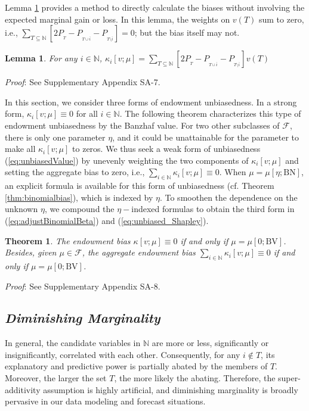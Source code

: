 \documentclass[a4paper,12pt]{article}
\newtheorem{theorem}{Theorem}
\newtheorem{lemma}{Lemma}
\begin{document}
Lemma \ref{lm:bias} provides a method to directly calculate the biases without involving the expected marginal gain or loss.
In this lemma, the weights on $v(T)$ sum to zero, i.e., $\sum\limits_{T\subseteq \mathbb{N}} \left [2 P_{_T} - P_{_{T \cup \overline{i}}} - P_{_{T \setminus \overline{i}}} \right ] = 0$; 
but the bias itself may not.
\begin{lemma}\label{lm:bias}
For any $i\in \mathbb{N}$,
$
\kappa_i [v;\mu] = \sum\limits_{T\subseteq \mathbb{N}} \left [2 P_{_T} - P_{_{T \cup \overline{i}}} - P_{_{T \setminus \overline{i}}} \right ] v(T)
$
\end{lemma}

\noindent \textit{Proof}: See Supplementary Appendix SA-7.

In this section, we consider three forms of endowment unbiasedness. In a strong form, $\kappa_i [v;\mu] \equiv 0$  for all $i\in \mathbb{N}$.
The following theorem characterizes this type of endowment unbiasedness by the Banzhaf value.
For two other subclasses of $\mathscr{F}$, there is only one parameter $\eta$, and
it could be unattainable for the parameter to make all $\kappa_i [v;\mu]$ to zeros. 
We thus seek a weak form of unbiasedness (\ref{eq:unbiasedValue}) by unevenly weighting the two components of $\kappa_i [v;\mu]$ and setting the aggregate bias to zero, 
i.e., $\sum\limits_{i\in \mathbb{N}} \kappa_i [v;\mu] \equiv 0$. 
When $\mu = \mu[\eta; \mathrm{BN}]$, an explicit formula is available for this form of unbiasedness (cf. Theorem \ref{thm:binomialbias}), which is indexed by $\eta$.
To smoothen the dependence on the unknown $\eta$, we compound the $\eta-$indexed formulas to obtain the third form in (\ref{eq:adjustBinomialBeta}) and (\ref{eq:unbiased_Shapley}).


\begin{theorem}\label{thm:bias_Banzhaf} 
The endowment bias $\kappa [v;\mu] \equiv 0$ if and only if  $\mu = \mu[0; \mathrm{BV}]$. 
Besides, given $\mu \in \mathscr{F}$, the aggregate endowment bias
 $\sum\limits_{i\in \mathbb{N}} \kappa_i [v;\mu] \equiv 0$ if and only if $\mu = \mu[0; \mathrm{BV}]$.
\end{theorem}

\noindent \textit{Proof}: See Supplementary Appendix SA-8.


\subsection{\textit{Diminishing Marginality}}
\noindent In general, the candidate variables in $\mathbb{N}$ are more or less, significantly or insignificantly, correlated with each other.
Consequently, for any $i\not \in T$, its explanatory and predictive power is
partially abated by the members of $T$. Moreover, the larger the set $T$, the more likely the abating.
Therefore, the super-additivity assumption is highly artificial, and diminishing marginality is broadly pervasive in our data modeling and forecast situations.
\end{document}
